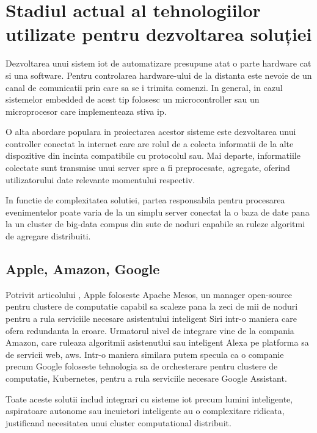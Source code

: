 \section {Stadiul actual al tehnologiilor utilizate pentru dezvoltarea soluției}

Dezvoltarea unui sistem \acrshort{iot} de automatizare presupune atat o parte hardware cat si una software. Pentru controlarea hardware-ului de la distanta este nevoie de un canal de comunicatii prin care sa se i trimita comenzi. In general, in cazul sistemelor embedded de acest tip folosesc un microcontroller sau un microprocesor care implementeaza stiva \acrshort{ip}.

O alta abordare populara in proiectarea acestor sisteme este dezvoltarea unui controller conectat la internet care are rolul de a colecta informatii de la alte dispozitive din incinta compatibile cu protocolul sau. Mai departe, informatiile colectate sunt transmise unui server spre a fi preprocesate, agregate, oferind utilizatorului date relevante momentului respectiv.

In functie de complexitatea solutiei, partea responsabila pentru procesarea evenimentelor poate varia de la un simplu server conectat la o baza de date pana la un cluster de big-data compus din sute de noduri capabile sa ruleze algoritmi de agregare distribuiti.


\subsection {Apple, Amazon, Google}

Potrivit articolului \cite{AppleRebuildsSiriMesos}, Apple foloseste Apache Mesos, un manager open-source pentru clustere de computatie capabil sa scaleze pana la zeci de mii de noduri pentru a rula serviciile necesare asistentului inteligent Siri intr-o maniera care ofera redundanta la eroare. Urmatorul nivel de integrare vine de la compania Amazon, care ruleaza algoritmii asistenutlui sau inteligent Alexa pe platforma sa de servicii web, \acrfull{aws}. Intr-o maniera similara putem specula ca o companie precum Google foloseste tehnologia sa de orchesterare pentru clustere de computatie, Kubernetes, pentru a rula serviciile necesare Google Assistant.

Toate aceste solutii includ integrari cu sisteme \acrshort{iot} precum lumini inteligente, aspiratoare autonome sau incuietori inteligente au o complexitare ridicata, justificand necesitatea unui cluster computational distribuit. 

